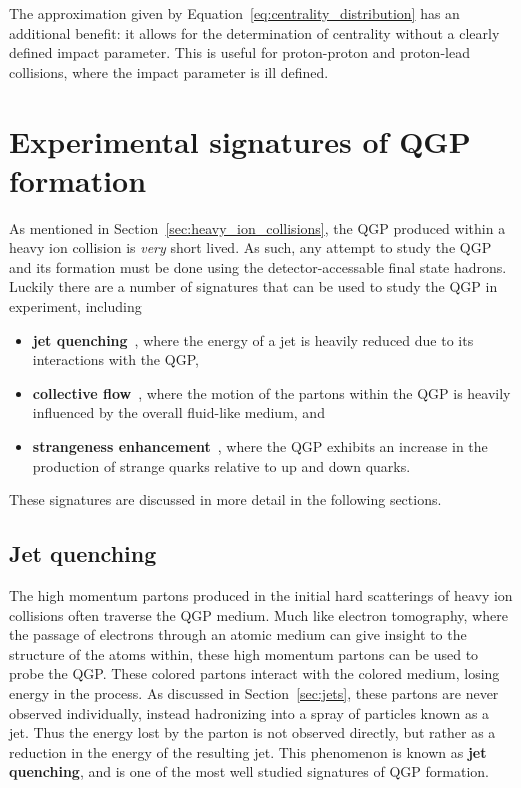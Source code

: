 The approximation given by Equation~\ref{eq:centrality_distribution} has an additional benefit: it allows for the determination of centrality without a clearly defined impact parameter. This is useful for proton-proton and proton-lead collisions, where the impact parameter is ill defined. 

\section{Experimental signatures of QGP formation}
\label{sec:qgp_signatures}

As mentioned in Section~\ref{sec:heavy_ion_collisions}, the QGP produced within a heavy ion collision is \textit{very} short lived. As such, any attempt to study the QGP and its formation must be done using the detector-accessable final state hadrons. Luckily there are a number of signatures that can be used to study the QGP in experiment, including
%
\begin{itemize}
    \item \textbf{jet quenching}~\cite{JetQuenching}, where the energy of a jet is heavily reduced due to its interactions with the QGP,
    \item \textbf{collective flow}~\cite{CollectiveFlow}, where the motion of the partons within the QGP is heavily influenced by the overall fluid-like medium, and
    \item \textbf{strangeness enhancement}~\cite{Strangeness}, where the QGP exhibits an increase in the production of strange quarks relative to up and down quarks.
\end{itemize}
%
These signatures are discussed in more detail in the following sections.

\subsection{Jet quenching}
\label{sec:jet_quenching}

The high momentum partons produced in the initial hard scatterings of heavy ion collisions often traverse the QGP medium. Much like electron tomography, where the passage of electrons through an atomic medium can give insight to the structure of the atoms within, these high momentum partons can be used to probe the QGP. These colored partons interact with the colored medium, losing energy in the process. As discussed in Section~\ref{sec:jets}, these partons are never observed individually, instead hadronizing into a spray of particles known as a jet. Thus the energy lost by the parton is not observed directly, but rather as a reduction in the energy of the resulting jet. This phenomenon is known as \textbf{jet quenching}, and is one of the most well studied signatures of QGP formation.

